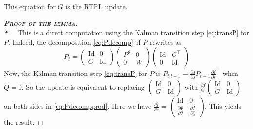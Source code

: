 \documentclass[11pt,a4paper]{article}
\newcommand{\thmheadercommand}[1]{\textbf{\scshape{}#1.\\*}}
\DeclareMathOperator{\Id}{Id}
\newcommand{\1}{\mathbbm{1}}
\newenvironment{dem}[1][]{\begin{proof}[\thmheadercommand{Proof#1}]~\newline\ignorespaces}{\end{proof}}
\theoremstyle{yannthm}
\theoremstyle{yannthm2}
\newcommand{\transp}[1]{#1^{\!\top}\!}
\newcommand{\Ptheta}{P^\theta}
\newcommand{\transf}{\Phi}
\numberwithin{equation}{section}
\begin{document}
This equation for $G$ is the RTRL update.

\begin{dem}[ of the lemma]
This is a direct computation using the Kalman transition step
\eqref{eq:transP} for $P$.
Indeed, the decomposition \eqref{eq:Pdecomp} of $P$ rewrites as
\begin{equation}
\label{eq:Pdecompprod}
P_t=
\begin{pmatrix} \Id & 0\\G &\Id \end{pmatrix}
\begin{pmatrix} \Ptheta &0\\0 &W \end{pmatrix}
\begin{pmatrix} \Id & \transp{G}\\0& \Id \end{pmatrix}
\end{equation}
Now, the Kalman transition step \eqref{eq:transP} for $P$ is
$P_{t|t-1}=\frac{\partial f}{\partial s}P_{t-1}
\transp{\frac{\partial f}{\partial s}}$ when $Q=0$.
So the update is equivalent to replacing $\begin{pmatrix} \Id & 0\\G &\Id
\end{pmatrix}$ with $\frac{\partial f}{\partial s}
\begin{pmatrix} \Id & 0\\G &\Id
\end{pmatrix}$ on both sides in \eqref{eq:Pdecompprod}.
Here we have $\frac{\partial
f}{\partial s}=\begin{pmatrix}
\Id & 0 \\
\frac{\partial \transf}{\partial \theta} & \frac{\partial \transf}{\partial
\hat y}
\end{pmatrix}$.
This yields the result.
\end{dem}
\end{document}

